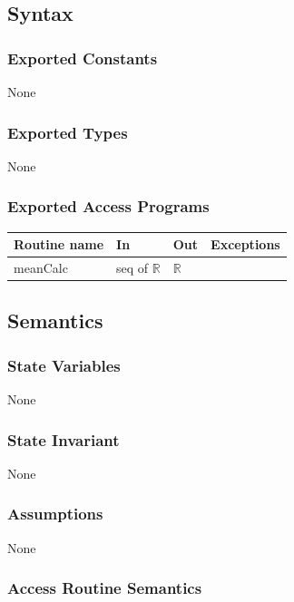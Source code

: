 \documentclass[12pt,fleqn]{examtst}
\begin{document}
\subsection* {Syntax}

\subsubsection* {Exported Constants}

None

\subsubsection* {Exported Types}

None 

\subsubsection* {Exported Access Programs}

\begin{tabular}{| l | l | l | p{5cm} |}
\hline
\textbf{Routine name} & \textbf{In} & \textbf{Out} & \textbf{Exceptions}\\
\hline
meanCalc & seq of $\mathbb{R}$ & $\mathbb{R}$ & ~\\
\hline
\end{tabular}

\subsection* {Semantics}

\subsubsection* {State Variables}

None

\subsubsection* {State Invariant}

None

\subsubsection* {Assumptions}

None

\subsubsection* {Access Routine Semantics}
\end{document}
